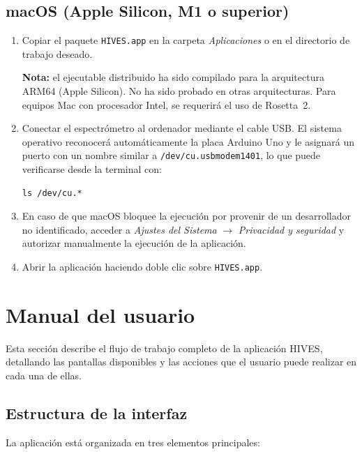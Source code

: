 \subsection*{macOS (Apple Silicon, M1 o superior)}
\begin{enumerate}
  \item Copiar el paquete \texttt{HIVES.app} en la carpeta \emph{Aplicaciones} o en
        el directorio de trabajo deseado.

        \textbf{Nota:} el ejecutable distribuido ha sido compilado para la
        arquitectura ARM64 (Apple Silicon). No ha sido probado en otras arquitecturas. Para 
        equipos Mac con procesador Intel, se requerirá el uso de Rosetta~2.
  \item Conectar el espectrómetro al ordenador mediante el cable USB. El sistema
        operativo reconocerá automáticamente la placa Arduino Uno y le asignará un
        puerto con un nombre similar a \texttt{/dev/cu.usbmodem1401}, lo que puede
        verificarse desde la terminal con:
\begin{verbatim}
ls /dev/cu.*
\end{verbatim}
  \item En caso de que macOS bloquee la ejecución por provenir de un desarrollador
        no identificado, acceder a \emph{Ajustes del Sistema} $\rightarrow$
        \emph{Privacidad y seguridad} y autorizar manualmente la ejecución de la
        aplicación.
  \item Abrir la aplicación haciendo doble clic sobre \texttt{HIVES.app}.
\end{enumerate}

\section{Manual del usuario}

Esta sección describe el flujo de trabajo completo de la aplicación HIVES,
detallando las pantallas disponibles y las acciones que el usuario puede
realizar en cada una de ellas.

\subsection*{Estructura de la interfaz}

La aplicación está organizada en tres elementos principales:

